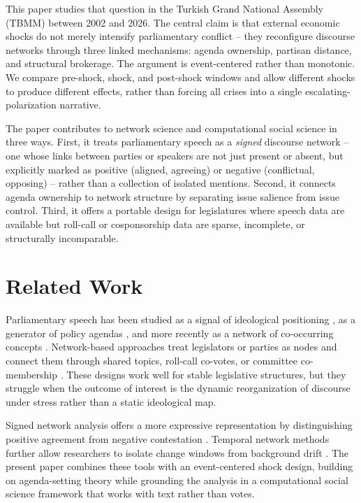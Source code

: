\documentclass[11pt]{article}
\begin{document}
This paper studies that question in the Turkish Grand National Assembly (TBMM) between 2002 and 2026. The central claim is that external economic shocks do not merely intensify parliamentary conflict -- they reconfigure discourse networks through three linked mechanisms: agenda ownership, partisan distance, and structural brokerage. The argument is event-centered rather than monotonic. We compare pre-shock, shock, and post-shock windows and allow different shocks to produce different effects, rather than forcing all crises into a single escalating-polarization narrative.

The paper contributes to network science and computational social science in three ways. First, it treats parliamentary speech as a \emph{signed} discourse network -- one whose links between parties or speakers are not just present or absent, but explicitly marked as positive (aligned, agreeing) or negative (conflictual, opposing) -- rather than a collection of isolated mentions. Second, it connects agenda ownership to network structure by separating issue salience from issue control. Third, it offers a portable design for legislatures where speech data are available but roll-call or cosponsorship data are sparse, incomplete, or structurally incomparable.

\section{Related Work}
Parliamentary speech has been studied as a signal of ideological positioning \cite{laver2003}, as a generator of policy agendas \cite{kleinnijenhuis1995}, and more recently as a network of co-occurring concepts \cite{garimella2018}. Network-based approaches treat legislators or parties as nodes and connect them through shared topics, roll-call co-votes, or committee co-membership \cite{porter2005}. These designs work well for stable legislative structures, but they struggle when the outcome of interest is the dynamic reorganization of discourse under stress rather than a static ideological map.

Signed network analysis offers a more expressive representation by distinguishing positive agreement from negative contestation \cite{bonchi2019, blohm2026}. Temporal network methods further allow researchers to isolate change windows from background drift \cite{gionis2024}. The present paper combines these tools with an event-centered shock design, building on agenda-setting theory \cite{kleinnijenhuis1995} while grounding the analysis in a computational social science framework that works with text rather than votes.
\end{document}
